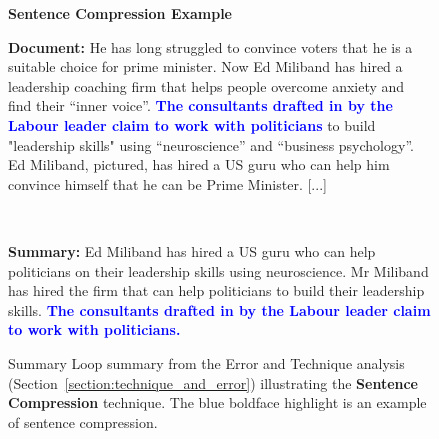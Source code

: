 \documentclass[11pt,a4paper]{article}
\begin{document}
\begin{figure*}[!htbp]
    \begin{framed}
\begin{center}
            \large
            \textbf{Sentence Compression Example}
        \end{center}
        \textbf{Document:}
        He has long struggled to convince voters that he is a suitable choice for prime minister. Now Ed Miliband has hired a leadership coaching firm that helps people overcome anxiety and find their ``inner voice''. \textbf{\textcolor{blue}{The consultants drafted in by the Labour leader claim to work with politicians}} to build "leadership skills" using ``neuroscience'' and ``business psychology''. Ed Miliband, pictured, has hired a US guru who can help him convince himself that he can be Prime Minister. [...]
        \begin{center}
            ~
        \end{center}
        \textbf{Summary:}
        Ed Miliband has hired a US guru who can help politicians on their leadership skills using neuroscience. Mr Miliband has hired the firm that can help politicians to build their leadership skills. \textbf{\textcolor{blue}{The consultants drafted in by the Labour leader claim to work with politicians.}}
        
    \end{framed}

    \caption{Summary Loop summary from the Error and Technique analysis (Section~\ref{section:technique_and_error}) illustrating the \textbf{Sentence Compression} technique. The blue boldface highlight is an example of sentence compression.}    \label{fig:extra_examples1}
\end{figure*}
\end{document}
